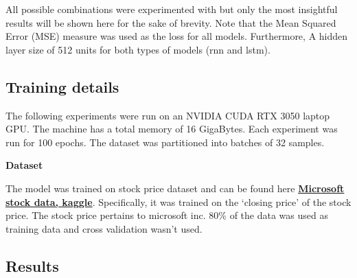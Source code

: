 \documentclass[12pt, letterpaper]{article}
\begin{document}
All possible combinations were experimented with but only the most insightful results will be shown here
for the sake of brevity. Note that the Mean Squared Error (MSE) measure was 
used as the loss for all models. Furthermore, A hidden layer 
size of 512 units for both types of models (rnn and lstm).

\subsection{Training details}

The following experiments were run on an NVIDIA CUDA RTX 3050 laptop GPU. The
machine has a total memory of 16 GigaBytes. Each experiment was run for 100 epochs.
The dataset was partitioned into batches of 32 samples. 

\textbf{Dataset}


The model was trained on stock price dataset and can be found here \textbf{\href{https://www.kaggle.com/datasets/vijayvvenkitesh/microsoft-stock-time-series-analysis}{Microsoft
stock data, kaggle}}. 
Specifically, it was trained on the `closing price' of the stock price. The stock 
price pertains to microsoft inc. 80\% of the data was used as training data and 
cross validation wasn't used.

\subsection{Results}
\end{document}
